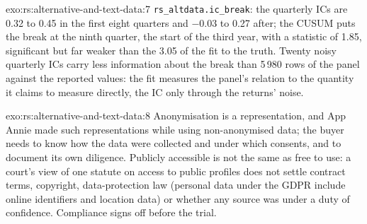 \begin{solution}{exo:rs:alternative-and-text-data:7}
\texttt{rs\_altdata.ic\_break}: the quarterly ICs are 0.32 to 0.45 in the first eight quarters and $-0.03$ to 0.27 after; the CUSUM puts the break
at the ninth quarter, the start of the third year, with a statistic of 1.85, significant but far weaker than the 3.05 of the fit to the truth.
Twenty noisy quarterly ICs carry less information about the break than 5\,980 rows of the panel against the reported values: the fit measures the
panel's relation to the quantity it claims to measure directly, the IC only through the returns' noise.
\end{solution}

\begin{solution}{exo:rs:alternative-and-text-data:8}
Anonymisation is a representation, and App Annie made such representations while using non-anonymised data; the buyer needs to know how the data
were collected and under which consents, and to document its own diligence. Publicly accessible is not the same as free to use: a court's view of one
statute on access to public profiles does not settle contract terms, copyright, data-protection law (personal data under the GDPR include online
identifiers and location data) or whether any source was under a duty of confidence. Compliance signs off before the trial.
\end{solution}

